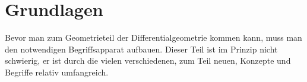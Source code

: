 \documentclass[a4paper, 12pt, halfparskip*,titlepage]{scrreprt}
\begin{document}


\pagestyle{empty}
\tableofcontents
\newpage
\pagestyle{plain}

\chapter{Grundlagen}
\label{chap:basics}

Bevor man zum Geometrieteil der Differentialgeometrie kommen kann,
muss man den notwendigen Begriffsapparat aufbauen. Dieser Teil ist
im Prinzip nicht schwierig, er ist durch die vielen verschiedenen, zum
Teil neuen, Konzepte und Begriffe relativ umfangreich.









%
\end{document}
